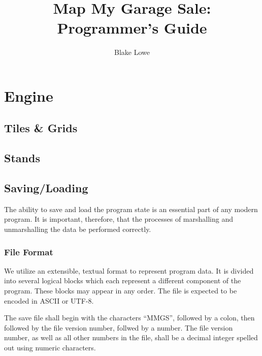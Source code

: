 \documentclass{report}
\title{Map My Garage Sale: Programmer's Guide}
\author{Blake Lowe}
\begin{document}
\maketitle
\newpage
{}

\tableofcontents
\newpage

\chapter{Engine}

\section{Tiles \& Grids}

\section{Stands}

\section{Saving/Loading}
The ability to save and load the program state is an essential part of
any modern program. It is important, therefore, that the processes of
marshalling and unmarshalling the data be performed correctly.

\subsection{File Format}
We utilize an extensible, textual format to represent program data.
It is divided into several logical blocks which each represent a different
component of the program. These blocks may appear in any order. The file
is expected to be encoded in ASCII or UTF-8.

The save file shall begin with the characters ``MMGS'', followed by a colon,
then followed by the file version number, follwed by a number. The
file version number, as well as all other numbers in the file, shall be a
decimal integer spelled out using numeric characters.
\end{document}
